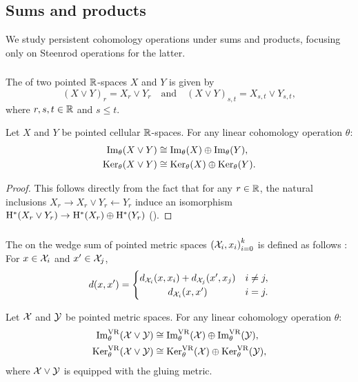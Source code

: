 
\subsection{Sums and products}\label{ss:sums_products}

We study persistent cohomology operations under sums and products, focusing only on Steenrod operations for the latter.

\subsubsection{}\label{ss:wedge_sum_general}

The  of two pointed \(\mathbb{R}\)-spaces \(X\) and \(Y\) is given by
\[
(X \vee Y)_r = X_r \vee Y_r \quad\text{and}\quad (X \vee Y)_{s,t} = X_{s,t} \vee Y_{s,t},
\]
where \(r, s, t \in \mathbb{R}\) and \(s \leq t\).

\lemma
Let $X$ and $Y$ be pointed cellular $\mathbb{R}$-spaces.
For any linear cohomology operation $\theta$:
\begin{align*}
	\operatorname{Im}_\theta(X \vee Y) &\cong \operatorname{Im}_\theta(X) \oplus \operatorname{Im}_\theta(Y), \\
	\operatorname{Ker}_\theta(X \vee Y) &\cong \operatorname{Ker}_\theta(X) \oplus \operatorname{Ker}_\theta(Y).
\end{align*}

\begin{proof}
	This follows directly from the fact that for any \(r \in \mathbb{R}\), the natural inclusions $X_r \to X_r \vee Y_r \leftarrow Y_r$ induce an isomorphism $\mathrm{H}^*(X_r \vee Y_r) \to \mathrm{H}^*(X_r) \oplus \mathrm{H}^*(Y_r)$ (\cite[Corollary~2.25]{hatcher2000}).
\end{proof}

\subsubsection{}\label{ss:wedge sum}

The  on the wedge sum of pointed metric spaces ${(\mathcal{X}_i, x_i)}_{i = 0}^k$ is defined as follows \cite{burago2001course}: For $x \in \mathcal{X}_i$ and $x' \in \mathcal{X}_j$,
\[
d(x, x') =
\begin{cases}
	d_{\cX_i}(x, x_i) + d_{\cX_j}(x', x_j) & i \neq j, \\
	\hfil d_{\cX_i}(x, x') & i = j.
\end{cases}
\]

\theorem
Let $\mathcal{X}$ and $\mathcal{Y}$ be pointed metric spaces.
For any linear cohomology operation $\theta$:
\begin{align*}
	\operatorname{Im}_\theta^{\mathrm{VR}}(\mathcal{X} \vee \mathcal{Y}) &\cong \operatorname{Im}_\theta^{\mathrm{VR}}(\mathcal{X}) \oplus \operatorname{Im}_\theta^{\mathrm{VR}}(\mathcal{Y}), \\
	\operatorname{Ker}_\theta^{\mathrm{VR}}(\mathcal{X} \vee \mathcal{Y}) &\cong \operatorname{Ker}_\theta^{\mathrm{VR}}(\mathcal{X}) \oplus \operatorname{Ker}_\theta^{\mathrm{VR}}(\mathcal{Y}),
\end{align*}
where \(\mathcal{X} \vee \mathcal{Y}\) is equipped with the gluing metric.

